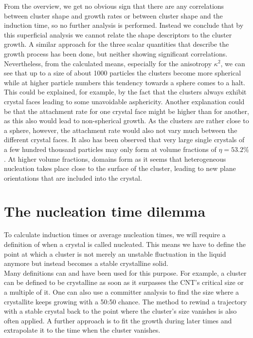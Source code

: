 From the overview, we get no obvious sign that there are any correlations between cluster shape and growth rates or between cluster shape and the induction time, so no further analysis is performed. Instead we conclude that by this superficial analysis we cannot relate the shape descriptors to the cluster growth. A similar approach for the three scalar quantities that describe the growth process has been done, but neither showing significant correlations.\\  

Nevertheless, from the calculated means, especially for the anisotropy $\kappa^2$, we can see that up to a size of about 1000 particles the clusters become more spherical while at higher particle numbers this tendency towards a sphere comes to a halt. This could be explained, for example, by the fact that the clusters always exhibit crystal faces leading to some unavoidable asphericity. Another explanation could be that the attachment rate for one crystal face might be higher than for another, as this also would lead to non-spherical growth. As the clusters are rather close to a sphere, however, the attachment rate would also not vary much between the different crystal faces. It also has been observed that very large single crystals of a few hundred thousand particles may only form at volume fractions of $\eta = 53.2 \%$. At higher volume fractions, domains form as it seems that heterogeneous nucleation takes place close to the surface of the cluster, leading to new plane orientations that are included into the crystal.

\section{The nucleation time dilemma}
\label{sec:nucleation_times}
To calculate induction times or average nucleation times, we will require a definition of when a crystal is called nucleated. This means we have to define the point at which a cluster is not merely an unstable fluctuation in the liquid anymore but instead becomes a stable crystalline solid.\\
Many definitions can and have been used for this purpose. For example, a cluster can be defined to be crystalline as soon as it surpasses the CNT's critical size or a multiple of it. One can also use a committer analysis to find the size where a crystallite keeps growing with a 50:50 chance. The method to rewind a trajectory with a stable crystal back to the point where the cluster's size vanishes is also often applied. A further approach is to fit the growth during later times and extrapolate it to the time when the cluster vanishes.\\

